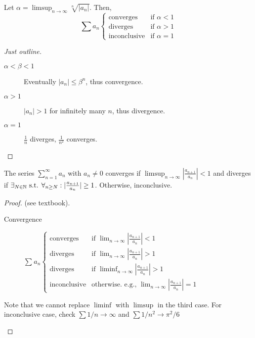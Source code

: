 \begin{theorem}
	\label{thm:3.33}
	Let $\alpha=\limsup_{n\to \infty}{\sqrt[n]{|a_n|}}$. Then,
	\[
		\sum{a_{n}}
		\begin{cases}
			\text{converges}    & \text{if } \alpha<1 \\
			\text{diverges}     & \text{if } \alpha>1 \\
			\text{inconclusive} & \text{if } \alpha=1
		\end{cases}
	\]

	\begin{proof}[Just outline]
		\begin{description}
			\item[$\alpha< \beta < 1$]
			      Eventually $|a_n|\le \beta^{n}$, thus convergence.
			\item[$\alpha > 1$]
			      $|a_{n}|>1$ for infinitely many $n$, thus divergence.
			\item[$\alpha=1$]
			      $\frac{1}{n}$ diverges, $\frac{1}{n^2}$ converges.
		\end{description}
	\end{proof}
\end{theorem}
\begin{theorem}
	\label{thm:3.34}
	The series $\sum_{n=1}^{\infty}{a_{n}}$ with $a_{n}\neq 0$ converges if $\limsup_{n\to \infty}{|\frac{a_{n+1}}{a_{n}}|}<1$ and diverges if $\exists_{N \in \mathbb{N}} \text{ s.t. } \forall_{n \ge  N}:  |\frac{a_{n+1}}{a_{n}}|\ge 1 $. Otherwise, inconclusive.
	\begin{proof}
		(see textbook).\\
		\begin{description}
			\item[Convergence]
			      $\sum_{}{a_{n}}
				      \begin{cases}
					      \text{converges}    & \text{if } \lim_{n\to \infty}{|\frac{a_{n+1}}{a_{n}}|}<1               \\
					      \text{diverges}     & \text{if } \lim_{n\to \infty}{|\frac{a_{n+1}}{a_{n}}|}>1               \\
					      \text{diverges}     & \text{if } \liminf_{n\to \infty}{|\frac{a_{n+1}}{a_{n}}|}>1            \\
					      \text{inconclusive} & \text{otherwise. e.g., } \lim_{n\to \infty}{|\frac{a_{n+1}}{a_{n}}|}=1
				      \end{cases}
			      $
		\end{description}
		\begin{note}
			Note that we cannot replace $\liminf$ with $\limsup$ in the third case.
			For inconclusive case, check $\sum{1/n}\to \infty$ and $\sum{1/n^2}\to \pi ^2 /6$
		\end{note}
	\end{proof}
\end{theorem}



